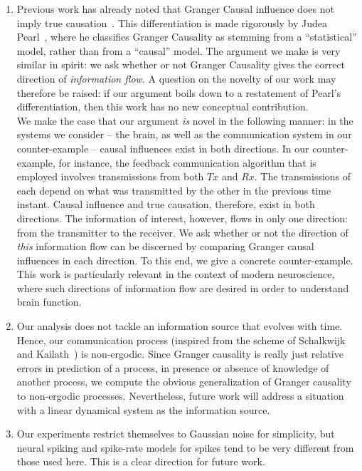 \documentclass[letterpaper, 10pt, conference]{ieeeconf}
\begin{document}
\begin{enumerate}
	\item \label{remark:gc-vs-true} Previous work has already noted that Granger Causal influence does not imply true causation~\cite{granger1980testing}. This differentiation is made rigorously by Judea Pearl~\cite{pearl2009causality-gc-stat}, where he classifies Granger Causality as stemming from a ``statistical'' model, rather than from a ``causal'' model. The argument we make is very similar in spirit: we ask whether or not Granger Causality gives the correct direction of \emph{information flow}. A question on the novelty of our work may therefore be raised: if our argument boils down to a restatement of Pearl's differentiation, then this work has no new conceptual contribution. \\
		We make the case that our argument \emph{is} novel in the following manner: in the systems we consider -- the brain, as well as the communication system in our counter-example -- causal influences exist in both directions. In our counter-example, for instance, the feedback communication algorithm that is employed involves transmissions from both $Tx$ and $Rx$. The transmissions of each depend on what was transmitted by the other in the previous time instant. Causal influence and true causation, therefore, exist in both directions. The information of interest, however, flows in only one direction: from the transmitter to the receiver. We ask whether or not the direction of \emph{this} information flow can be discerned by comparing Granger causal influences in each direction. To this end, we give a concrete counter-example. This work is particularly relevant in the context of modern neuroscience, where such directions of information flow are desired in order to understand brain function.
	\item Our analysis does not tackle an information source that evolves with time. Hence, our communication process (inspired from the scheme of Schalkwijk and Kailath~\cite{S&K}) is non-ergodic. Since Granger causality is really just relative errors in prediction of a process, in presence or absence of knowledge of another process, we compute the obvious generalization of Granger causality to non-ergodic processes. Nevertheless, future work will address a situation with a linear dynamical system as the information source.
	\item Our experiments restrict themselves to Gaussian noise for simplicity, but neural spiking and spike-rate models for spikes tend to be very different from those used here. This is a clear direction for future work.

\end{enumerate}
\end{document}
